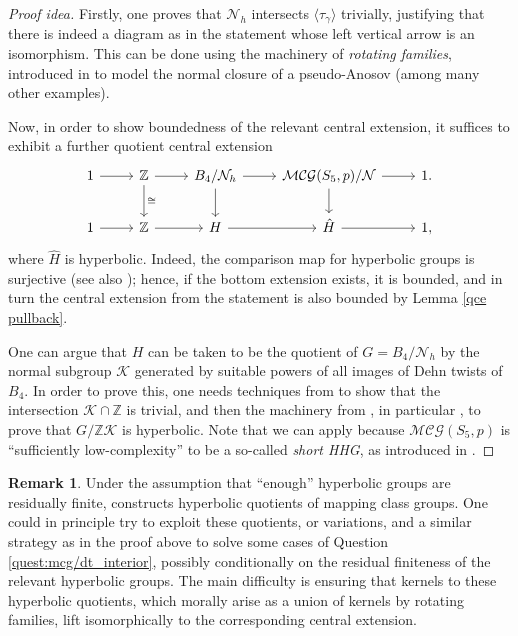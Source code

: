\documentclass[svgnames]{amsart}
\theoremstyle{plain}
\theoremstyle{definition}
\newtheorem{rem}[thm]{Remark}
\newcommand{\cal}[1]{\mathcal{#1}}
\newcommand{\calG}{\cal{MCG}}
\newcommand{\N}{\cal{N}}
\newcommand{\Z}{\mathbb{Z}}
\begin{document}
\begin{proof}[Proof idea]
Firstly, one proves that $\N_h$ intersects $\langle \tau_\gamma\rangle$ trivially, justifying that there is indeed a diagram as in the statement whose left vertical arrow is an isomorphism. This can be done using the machinery of \emph{rotating families}, introduced in \cite{DGO} to model the normal closure of a pseudo-Anosov (among many other examples). 

Now, in order to show boundedness of the relevant central extension, it suffices to exhibit a further quotient central extension
$$\begin{tikzcd}
    1\ar{r}& \mathbb Z\ar{r}\ar[d,"\cong"]&B_4/\N_h\ar{r}\ar{d}&\calG(S_5, p)/\N\ar{r}\ar{d}&1.\\
    1\ar{r}& \mathbb{Z} \ar{r}&H \ar{r}&\hat H\ar{r}&1,
\end{tikzcd}$$
where $\hat H$ is hyperbolic. Indeed, the comparison map for hyperbolic groups is surjective \cite{neumannreeves} (see also \cite{mineyev}); hence, if the bottom extension exists, it is bounded, and in turn the central extension from the statement is also bounded by Lemma \ref{qce pullback}. 

One can argue that $H$ can be taken to be the quotient of $G=B_4/\N_h$ by the normal subgroup $\cal K$ generated by suitable powers of all images of Dehn twists of $B_4$. In order to prove this, one needs techniques from \cite{dahmani:rotating} to show that the intersection $\cal K\cap \Z$ is trivial, and then the machinery from \cite{short_HHG:I,short_HHG:II}, in particular \cite[Theorem 4.1]{short_HHG:II}, to prove that $G/\Z\cal K$ is hyperbolic. Note that we can apply \cite{short_HHG:I,short_HHG:II} because $\calG(S_5, p)$ is ``sufficiently low-complexity'' to be a so-called \emph{short HHG}, as introduced in \cite{short_HHG:I}.
\end{proof}







\begin{rem}\label{rem:enough_hyp_rf}
    Under the assumption that ``enough'' hyperbolic groups are residually finite, \cite{BHMS} constructs hyperbolic quotients of mapping class groups. One could in principle try to exploit these quotients, or variations, and a similar strategy as in the proof above to solve some cases of Question \ref{quest:mcg/dt_interior}, possibly conditionally on the residual finiteness of the relevant hyperbolic groups. The main difficulty is ensuring that kernels to these hyperbolic quotients, which morally arise as a union of kernels by rotating families, lift isomorphically to the corresponding central extension. 
\end{rem}







\end{document}
